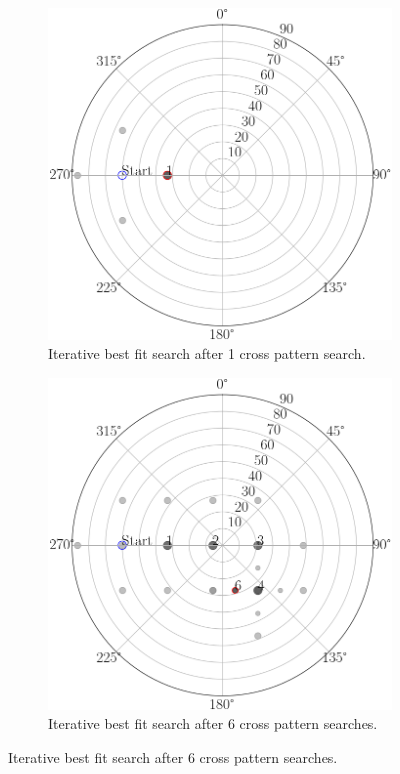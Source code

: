 \begin{figure}
     \centering
     \begin{subfigure}[b]{0.45\textwidth}
         \centering
         \includegraphics[width=\textwidth]{pics/iterative_1_step}
         \caption{Iterative best fit search after 1 cross pattern search.}
         \label{fig_iterative_1_step}
     \end{subfigure}
     \hfill
     \begin{subfigure}[b]{0.45\textwidth}
         \centering
         \includegraphics[width=\textwidth]{pics/iterative_6_step}
         \caption{Iterative best fit search after 6 cross pattern searches.}
         \label{fig_iterative_6_step}
     \end{subfigure}
     \hfill
     

\end{figure}
